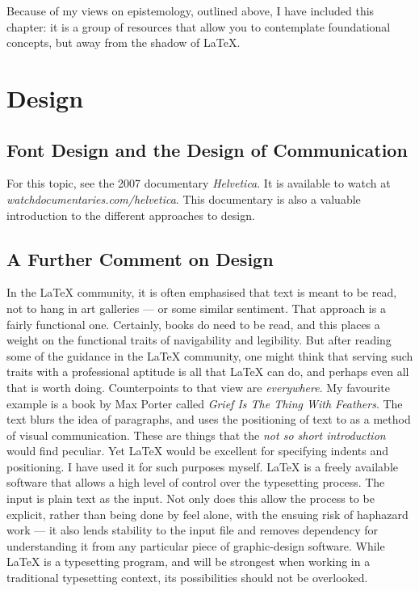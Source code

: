 \documentclass[12pt, oneside]{memoir}
\begin{document}
Because of my views on epistemology, outlined above, I have included this chapter: it is a group of resources that allow you to contemplate foundational concepts, but away from the shadow of \LaTeX{}.

\section*{Design}

\subsection*{Font Design and the Design of Communication}
For this topic, see the 2007 documentary \emph{Helvetica}. It is available to watch at \emph{watchdocumentaries.com/helvetica}. This documentary is also a valuable introduction to the different approaches to design. 

\subsection*{A Further Comment on Design}
In the \LaTeX{} community, it is often emphasised that text is meant to be read, not to hang in art galleries — or some similar sentiment. That approach is a fairly functional one. Certainly, books do need to be read, and this places a weight on the functional traits of navigability and 
legibility. But after reading some of the guidance in the \LaTeX{} community, one might think that serving such traits with a professional aptitude is all that \LaTeX{} can do, and perhaps even all that is worth doing. Counterpoints to that view are \emph{everywhere}. My favourite example is a book by Max Porter called \emph{Grief Is The Thing With Feathers}. The text blurs the idea of paragraphs, and uses the positioning of text to as a method of visual communication. These are things that the \emph{not so short introduction} would find peculiar. Yet \LaTeX{} would be excellent for specifying indents and positioning. I have used it for such purposes myself. \LaTeX{} is a freely available software that allows a high level of control over the typesetting process. The input is plain text as the input. Not only does this allow the process to be explicit, rather than being done by feel alone, with the ensuing risk of haphazard work — it also lends stability to the input file and removes dependency for understanding it from any particular piece of graphic-design software. While \LaTeX{} is a typesetting program, and will be strongest when working in a traditional typesetting context, its possibilities should not be overlooked.
\end{document}
